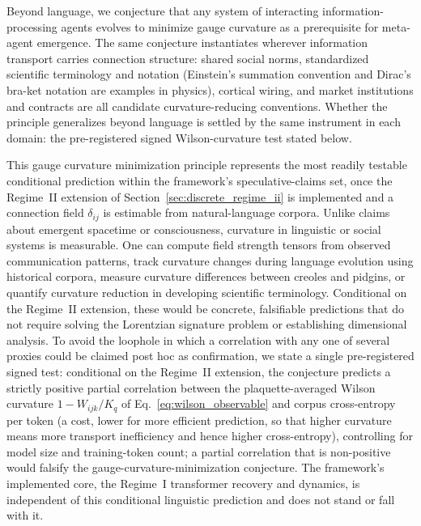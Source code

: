\documentclass[11pt]{article}
\begin{document}
Beyond language, we conjecture that any system of interacting information-processing agents evolves to minimize gauge curvature as a prerequisite for meta-agent emergence. The same conjecture instantiates wherever information transport carries connection structure: shared social norms, standardized scientific terminology and notation (Einstein's summation convention and Dirac's bra-ket notation are examples in physics), cortical wiring, and market institutions and contracts are all candidate curvature-reducing conventions. Whether the principle generalizes beyond language is settled by the same instrument in each domain: the pre-registered signed Wilson-curvature test stated below.

This gauge curvature minimization principle represents the most readily testable conditional prediction within the framework's speculative-claims set, once the Regime~II extension of Section~\ref{sec:discrete_regime_ii} is implemented and a connection field $\delta_{ij}$ is estimable from natural-language corpora. Unlike claims about emergent spacetime or consciousness, curvature in linguistic or social systems is measurable. One can compute field strength tensors from observed communication patterns, track curvature changes during language evolution using historical corpora, measure curvature differences between creoles and pidgins, or quantify curvature reduction in developing scientific terminology. Conditional on the Regime~II extension, these would be concrete, falsifiable predictions that do not require solving the Lorentzian signature problem or establishing dimensional analysis. To avoid the loophole in which a correlation with any one of several proxies could be claimed post hoc as confirmation, we state a single pre-registered signed test: conditional on the Regime~II extension, the conjecture predicts a strictly positive partial correlation between the plaquette-averaged Wilson curvature $1 - W_{ijk}/K_q$ of Eq.~\eqref{eq:wilson_observable} and corpus cross-entropy per token (a cost, lower for more efficient prediction, so that higher curvature means more transport inefficiency and hence higher cross-entropy), controlling for model size and training-token count; a partial correlation that is non-positive would falsify the gauge-curvature-minimization conjecture. The framework's implemented core, the Regime~I transformer recovery and dynamics, is independent of this conditional linguistic prediction and does not stand or fall with it.
\end{document}
